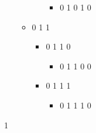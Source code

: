 \begin{itemize}
\begin{itemize}
\begin{itemize}
\begin{itemize}
\item 0 1 0 1 0
\end{itemize}
\end{itemize}
\item 0 1 1 


\begin{itemize}
\item 0 1 1 0 


\begin{itemize}
\item 0 1 1 0 0
\end{itemize}
\item 0 1 1 1 


\begin{itemize}
\item 0 1 1 1 0
\end{itemize}
\end{itemize}
\end{itemize}
\end{itemize}
1 

